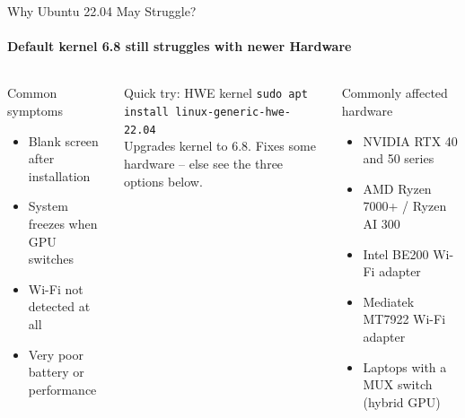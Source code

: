 \documentclass[aspectratio=169]{beamer}
\begin{document}
\begin{frame}{Why Ubuntu 22.04 May Struggle?}
  \framesubtitle{Default kernel 6.8 still struggles with newer Hardware}
  \begin{columns}
      \begin{alertblock}{Common symptoms}
        \begin{itemize}
          \item Blank screen after installation
          \item System freezes when GPU switches
          \item Wi-Fi not detected at all
          \item Very poor battery or performance
        \end{itemize}
      \end{alertblock}
      \footnotesize
      \begin{exampleblock}{Quick try: HWE kernel}
        \texttt{sudo apt install linux-generic-hwe-22.04}\\[0.15em]
        Upgrades kernel to 6.8. Fixes some hardware --
        else see the three options below.
      \end{exampleblock}
      \small
      \begin{block}{Commonly affected hardware}
        \begin{itemize}
          \item NVIDIA RTX 40 and 50 series
          \item AMD Ryzen 7000+ / Ryzen AI 300
          \item Intel BE200 Wi-Fi adapter
          \item Mediatek MT7922 Wi-Fi adapter
          \item Laptops with a MUX switch (hybrid GPU)
        \end{itemize}
      \end{block}
  \end{columns}
\end{frame}
\end{document}

